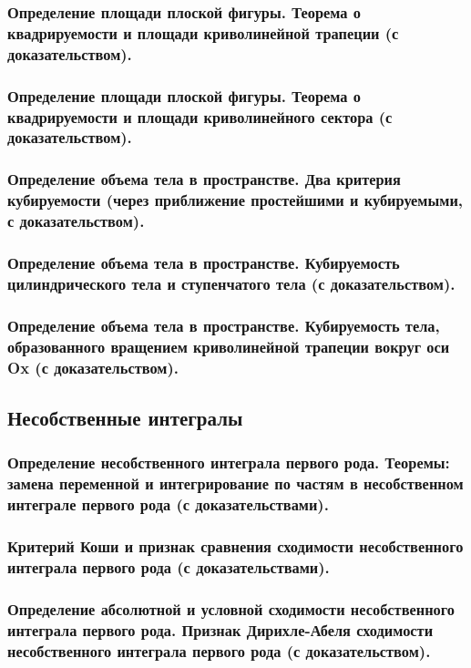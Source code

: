 \documentclass[10pt]{article}
\begin{document}
    \subsubsection{Определение площади плоской фигуры. Теорема о квадрируемости и площади криволинейной трапеции (с доказательством).}
    \subsubsection{Определение площади плоской фигуры. Теорема о квадрируемости и площади криволинейного сектора (с доказательством).}
    \subsubsection{Определение объема тела в пространстве. Два критерия кубируемости (через приближение простейшими и кубируемыми, с доказательством).}
    \subsubsection{Определение объема тела в пространстве. Кубируемость цилиндрического тела и ступенчатого тела (с доказательством).}
    \subsubsection{Определение объема тела в пространстве. Кубируемость тела, образованного вращением криволинейной трапеции вокруг оси Ox (с доказательством).}
    \subsection{Несобственные интегралы}
    \subsubsection{Определение несобственного интеграла первого рода. Теоремы: замена переменной и интегрирование по частям в несобственном интеграле первого рода (с доказательствами).}
    \subsubsection{Критерий Коши и признак сравнения сходимости несобственного интеграла первого рода (с доказательствами).}
    \subsubsection{Определение абсолютной и условной сходимости несобственного интеграла первого рода. Признак Дирихле-Абеля сходимости несобственного интеграла первого рода (с доказательством).}
\end{document}
